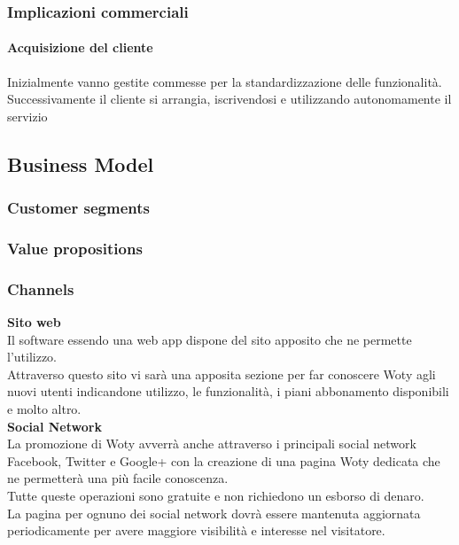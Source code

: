 \subsubsection{Implicazioni commerciali}
\paragraph{Acquisizione del cliente}
Inizialmente vanno gestite commesse per la standardizzazione delle funzionalità. Successivamente il cliente si arrangia, iscrivendosi e utilizzando autonomamente il servizio


\subsection{Business Model}
\subsubsection{Customer segments}
\subsubsection{Value propositions}



\subsubsection{Channels}

\textbf{Sito web}\\
Il software essendo una web app dispone del sito apposito che ne permette l'utilizzo.\\
Attraverso questo sito vi sarà una apposita sezione per far conoscere Woty agli nuovi utenti indicandone utilizzo, le funzionalità, i piani abbonamento disponibili e molto altro.\\



\textbf{Social Network}\\

La promozione di Woty avverrà anche attraverso i principali social network Facebook, Twitter e Google+ con la creazione di una pagina Woty dedicata che ne permetterà una più facile conoscenza.\\
Tutte queste operazioni sono gratuite e non richiedono un esborso di denaro.\\
La pagina per ognuno dei social network dovrà essere mantenuta aggiornata periodicamente per avere maggiore visibilità e interesse nel visitatore.\\

